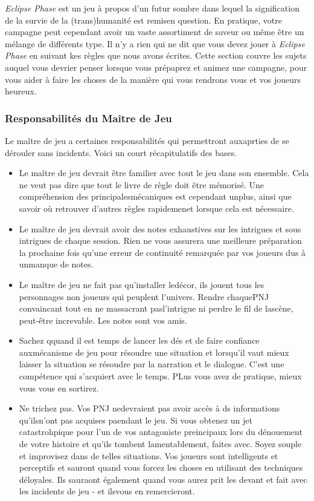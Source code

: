 \textit{Eclipse Phase} est un jeu à propos d'un futur sombre dans lequel la signification de la survie de la (trans)humanité est remisen question. En pratique, votre campagne peut cependant avoir un vaste assortiment de saveur ou même être un mélange de différents type. Il n'y a rien qui ne dit que vous devez jouer à \textit{Eclipse Phase} en suivant kes règles que nous avons écrites. Cette section couvre les sujets auquel vous devrier penser lorsque vous prépaprez et animez une campagne, pour vous aider à faire les choses de la manière qui vous rendrons vous et vos joueurs heureux. 

\subsubsection{Responsabilités du Maître de Jeu} 

Le maître de jeu a certaines responsabilités qui permettront auxaprties de se dérouler sans incidents. Voici un court récapitulatifs des bases. 

\begin{itemize} \item Le maître de jeu devrait être familier avec tout le jeu dans son ensemble. Cela ne veut pas dire que tout le livre de règle doit être mémorisé. Une compréhension des principalesmécaniques est cependant unplus, ainsi que savoir où retrouver d'autres règles rapidemenet lorsque cela est nécessaire. \item Le maître de jeu devrait avoir des notes exhaustives sur les intrigues et sous intrigues de chaque session. Rien ne vous assurera une meilleure préparation la prochaine fois qu'une erreur de continuité remarquée par vos joueurs dus à unmanque de notes. \item Le maître de jeu ne fait pas qu'installer ledécor, ils jouent tous les personnages non joueurs qui peuplent l'univers. Rendre chaquePNJ convaincant tout en ne massacrant pasl'intrigue ni perdre le fil de lascène, peut-être increvable. Les notes sont vos amis. \item Sachez qquand il est temps de lancer les dés et de faire confiance auxmécanisme de jeu pour résoudre une situation et lorsqu'il vaut mieux laisser la situation se résoudre par la narration et le dialogue. C'est une compétence qui s'acquiert avec le temps. PLus vous avez de pratique, mieux vous vous en sortirez. \item Ne trichez pas. Vos PNJ nedevraient pas avoir accès à ds informations qu'ilsn'ont pas acquises paendant le jeu. Si vous obtenez un jet catastrohpique pour l'un de vos antagoniste preincipaux lors du dénouement de votre histoire et qu'ils tombent lamentablement, faites avec. Soyez souple et improvisez dans de telles situations. Vos joueurs sont intelligents et perceptifs et sauront quand vous forcez les choses en utilisant des techniques déloyales. Ils sauraont également quand vous aurez prit les devant et fait avec les incidents de jeu - et ilsvous en remercieront. \end{itemize} 

